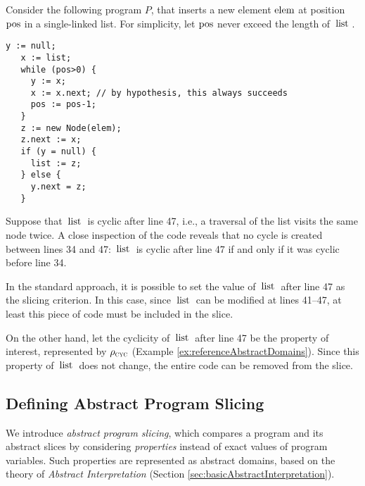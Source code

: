 \documentclass[prodmode,acmtocl]{acmsmall}
\def\prog{\ensuremath{P}\xspace}
\def\uco{\ensuremath{\rho}\xspace}
\newcommand{\0}{\mbox{\bf 0}}
\newcommand{\CODE}[1]{\ensuremath{\mbox{\lstinline!#1!}\xspace}\xspace}
\def\CYCLEDOM{\ensuremath{\uco_{\textsc{cyc}}}\xspace}
\begin{document}
\begin{example}
  \label{ex:abstractSlicing}
  Consider the following program $\prog$, that inserts a new element
  \CODE{elem} at position \CODE{pos} in a single-linked list.  For
  simplicity, let \CODE{pos} never exceed the length of \CODE{list}.
  {\em
    \begin{lstlisting}[firstnumber=34]
   y := null;
   x := list;
   while (pos>0) {
     y := x;
     x := x.next; // by hypothesis, this always succeeds
     pos := pos-1;
   }
   z := new Node(elem);
   z.next := x;
   if (y = null) {
     list := z;
   } else {
     y.next = z;
   }
    \end{lstlisting}
  }
  \noindent Suppose that \CODE{list} is cyclic after line 47, i.e., a
  traversal of the list visits the same node twice.  A close
  inspection of the code reveals that no cycle is created between
  lines 34 and 47: \CODE{list} is cyclic after line 47 if and only if
  it was cyclic before line 34.
  
  In the standard approach, it is possible to set the value of
  \CODE{list} after line 47 as the slicing criterion.  In this case,
  since \CODE{list} can be modified at lines 41--47, at least this
  piece of code must be included in the slice.

  On the other hand, let the cyclicity of \CODE{list} after line 47 be
  the property of interest, represented by $\CYCLEDOM$ (Example
  \ref{ex:referenceAbstractDomains}).  Since this property of
  \CODE{list} does not change, the entire code can be removed from the
  slice.
\end{example}

\subsection{Defining Abstract Program Slicing}
\label{sec:definingAbstractProgramSlicing}

We introduce \emph{abstract program slicing}, which compares a program
and its abstract slices by considering \emph{properties} instead of
exact values of program variables.  Such properties are represented as
abstract domains, based on the theory of \emph{Abstract
  Interpretation} (Section \ref{sec:basicAbstractInterpretation}).
\end{document}
